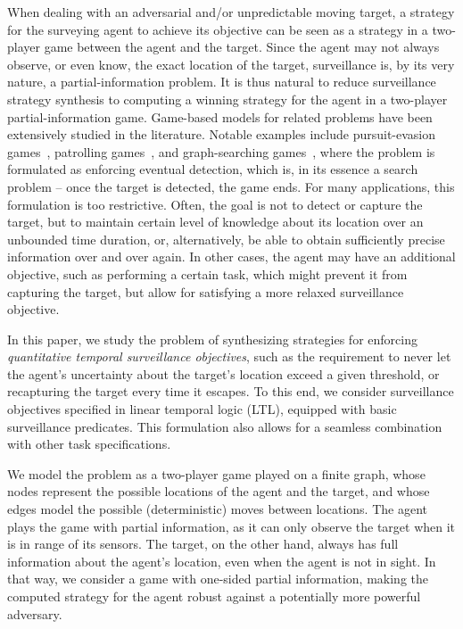 When dealing with an adversarial and/or unpredictable moving target, a strategy for the surveying agent to achieve its objective can be seen as a strategy in a two-player game between the agent and the target. Since the agent may not always observe, or even know, the exact location of the target, surveillance is, by its very nature, a partial-information problem.
It is thus natural to reduce surveillance strategy synthesis to computing a winning strategy for the agent in a two-player partial-information game. Game-based models for related problems have been extensively studied in the literature. Notable examples include pursuit-evasion games~\cite{Chung2011}, patrolling games~\cite{Basilico12}, and graph-searching games~\cite{Kreutzer11}, where the problem is formulated as enforcing eventual detection, which is, in its essence a search problem -- once the target is detected, the game ends. For many applications, this formulation is too restrictive. Often, the goal is not to detect or capture the target, but to maintain certain level of knowledge about its location over an unbounded time duration, or, alternatively, be able to obtain sufficiently precise information over and over again. In other cases, the agent may have an additional objective, such as performing a certain task, which might prevent it from capturing the target, but allow for satisfying a more relaxed surveillance objective.

In this paper, we study the problem of synthesizing strategies for enforcing \emph{quantitative temporal surveillance objectives}, such as the requirement to never let the agent's uncertainty about the target's location exceed a given threshold, or recapturing the target every time it escapes. To this end, we consider surveillance objectives specified in linear temporal logic (LTL), equipped with basic surveillance predicates. This formulation also allows for a seamless combination with other task specifications.

We model the problem as a two-player game played on a finite graph, whose nodes represent the possible locations of the agent and the target, and whose edges model the possible (deterministic) moves between locations. The agent plays the game with partial information, as it can only observe the target when  it is in range of its sensors. The target, on the other hand, always has full information about the agent's location, even when the agent is not in sight. In that way, we consider a game with one-sided partial information, making the computed strategy for the agent robust against a potentially more powerful adversary. 

